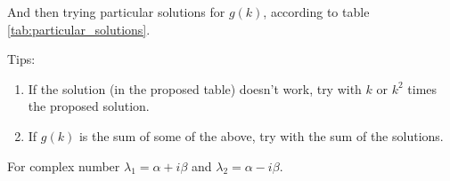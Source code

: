 And then trying particular solutions for $g(k)$, according to table \ref{tab:particular_solutions}.

\begin{remark*} Tips:
    \begin{enumerate}
        \item If the solution (in the proposed table) doesn't work, try with $k$ or $k^2$ times the proposed solution.

        \item If $g(k)$ is the sum of some of the above, try with the sum of the solutions.
    \end{enumerate}
\end{remark*}


\begin{remark*}
    For complex number $\lambda_1 = \alpha + i\beta$ and $\lambda_2 = \alpha - i\beta$.


\end{remark*}
